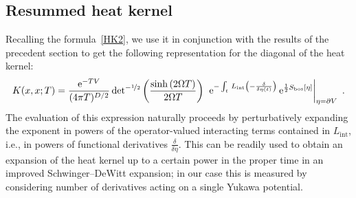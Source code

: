 \documentclass[12pt,a4paper]{article}
\numberwithin{equation}{section}
\numberwithin{equation}{section}
\begin{document}
\subsection{Resummed heat kernel} \label{sec2.2}
Recalling the formula~\eqref{HK2}, we use it in conjunction with the results of the precedent section to get the following representation for the diagonal of the heat kernel: 
\begin{equation} \label{R}
K(x,x;T)=\frac{\mathrm{e}^{-T V}}{(4\pi T)^{D/2} }\, \mathrm{det}^{-\nicefrac{1}{2}}\left(\frac{\sinh\left( 2\Omega T\right)}{2\Omega T}\right)\;\left. \mathrm{e}^{-\int_t \, L_{\mathrm{int}}\left(-\frac{\delta}{\delta \eta(t)} \right)} \, \mathrm{e}^{\frac12 S_{\mathrm{bos}}[\eta]}\right|_{\eta=\partial V}\ .
\end{equation}
The evaluation of this expression naturally proceeds by perturbatively expanding the exponent in powers of the operator-valued interacting terms contained in $L_{\mathrm{int}}$, i.e., in powers of functional derivatives $\frac{\delta}{\delta \eta}$. This can be readily used to obtain an expansion of the heat kernel up to a certain power in the proper time in an improved Schwinger--DeWitt expansion; in our case this is measured by considering number of derivatives acting on a single Yukawa potential. 
\end{document}
